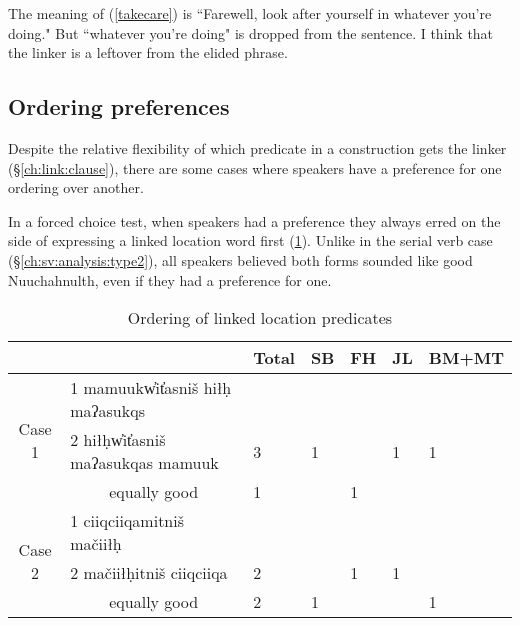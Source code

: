 The meaning of (\ref{takecare}) is ``Farewell, look after yourself in whatever you're doing." But ``whatever you're doing" is dropped from the sentence. I think that the linker is a leftover from the elided phrase. %

\subsection{Ordering preferences} \label{ch:link:preferences}

Despite the relative flexibility of which predicate in a construction gets the linker (\S\ref{ch:link:clause}), there are some cases where speakers have a preference for one ordering over another.

In a forced choice test, when speakers had a preference they always erred on the side of expressing a linked location word first (\cref{table:orderinglinkloc}). Unlike in the serial verb case (\S\ref{ch:sv:analysis:type2}), all speakers believed both forms sounded like good Nuuchahnulth, even if they had a preference for one.

\begin{table}[H]
\centering
\caption{Ordering of linked location predicates}
\label{table:orderinglinkloc}
\begin{tabular}{cllllll}
 &  & Total & SB & FH & JL & BM+MT \\ \hline
\multicolumn{1}{|c|}{\multirow{3}{*}{Case 1}} & \multicolumn{1}{l|}{1 mamuukw̓it̓asniš hiłḥ maʔasukqs} & \multicolumn{1}{l|}{} & \multicolumn{1}{l|}{} & \multicolumn{1}{l|}{} & \multicolumn{1}{l|}{} & \multicolumn{1}{l|}{} \\ \cline{2-7} 
\multicolumn{1}{|c|}{} & \multicolumn{1}{l|}{2 hiłḥw̓it̓asniš maʔasukqas mamuuk} & \multicolumn{1}{l|}{3} & \multicolumn{1}{l|}{1} & \multicolumn{1}{l|}{} & \multicolumn{1}{l|}{1} & \multicolumn{1}{l|}{1} \\ \cline{2-7} 
\multicolumn{1}{|c|}{} & \multicolumn{1}{c|}{equally good} & \multicolumn{1}{l|}{1} & \multicolumn{1}{l|}{} & \multicolumn{1}{l|}{1} & \multicolumn{1}{l|}{} & \multicolumn{1}{l|}{} \\ \hline \hline
\multicolumn{1}{|c|}{\multirow{3}{*}{Case 2}} & \multicolumn{1}{l|}{1 ciiqciiqamitniš mačiiłḥ} & \multicolumn{1}{l|}{} & \multicolumn{1}{l|}{} & \multicolumn{1}{l|}{} & \multicolumn{1}{l|}{} & \multicolumn{1}{l|}{} \\ \cline{2-7} 
\multicolumn{1}{|c|}{} & \multicolumn{1}{l|}{2 mačiiłḥitniš ciiqciiqa} & \multicolumn{1}{l|}{2} & \multicolumn{1}{l|}{} & \multicolumn{1}{l|}{1} & \multicolumn{1}{l|}{1} & \multicolumn{1}{l|}{} \\ \cline{2-7} 
\multicolumn{1}{|c|}{} & \multicolumn{1}{c|}{equally good} & \multicolumn{1}{l|}{2} & \multicolumn{1}{l|}{1} & \multicolumn{1}{l|}{} & \multicolumn{1}{l|}{} & \multicolumn{1}{l|}{1} \\ \hline
\end{tabular}
\end{table}

